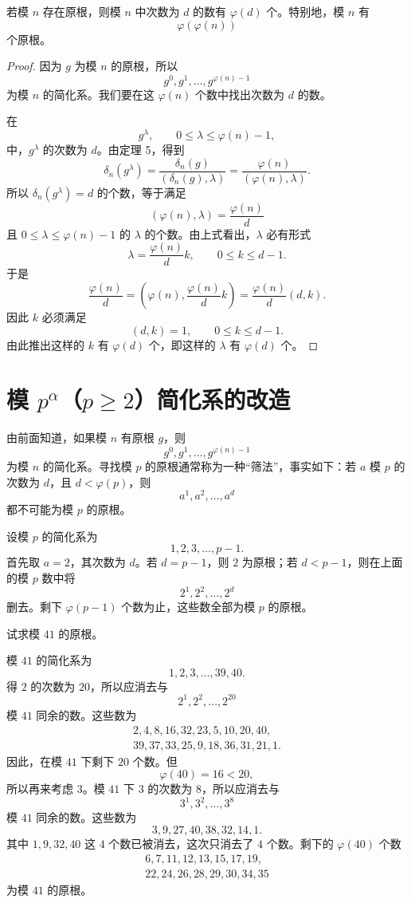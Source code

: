 \begin{theorem}[原文 定理 12]
	若模 $n$ 存在原根，则模 $n$ 中次数为 $d$ 的数有 $\varphi(d)$ 个。特别地，模 $n$ 有
	\[
		\varphi(\varphi(n))
	\]
	个原根。
\end{theorem}

\begin{proof}
	因为 $g$ 为模 $n$ 的原根，所以
	\[
		g^0,g^1,\ldots,g^{\varphi(n)-1}
	\]
	为模 $n$ 的简化系。我们要在这 $\varphi(n)$ 个数中找出次数为 $d$ 的数。

	在
	\[
		g^\lambda,\qquad 0\leq \lambda\leq \varphi(n)-1,
	\]
	中，$g^\lambda$ 的次数为 $d$。由定理 5，得到
	\[
		\delta_n(g^\lambda)
		=
		\frac{\delta_n(g)}{(\delta_n(g),\lambda)}
		=
		\frac{\varphi(n)}{(\varphi(n),\lambda)}.
	\]
	所以 $\delta_n(g^\lambda)=d$ 的个数，等于满足
	\[
		(\varphi(n),\lambda)=\frac{\varphi(n)}{d}
	\]
	且 $0\leq \lambda\leq \varphi(n)-1$ 的 $\lambda$ 的个数。由上式看出，$\lambda$ 必有形式
	\[
		\lambda=\frac{\varphi(n)}{d}k,\qquad 0\leq k\leq d-1.
	\]
	于是
	\[
		\frac{\varphi(n)}{d}
		=
		\left(\varphi(n),\frac{\varphi(n)}{d}k\right)
		=
		\frac{\varphi(n)}{d}(d,k).
	\]
	因此 $k$ 必须满足
	\[
		(d,k)=1,\qquad 0\leq k\leq d-1.
	\]
	由此推出这样的 $k$ 有 $\varphi(d)$ 个，即这样的 $\lambda$ 有 $\varphi(d)$ 个。
\end{proof}

\section{\texorpdfstring{模 \(p^\alpha\)（\(p\geq 2\)）简化系的改造}{模 p alpha 简化系的改造}}

由前面知道，如果模 $n$ 有原根 $g$，则
\[
	g^0,g^1,\ldots,g^{\varphi(n)-1}
\]
为模 $n$ 的简化系。寻找模 $p$ 的原根通常称为一种“筛法”，事实如下：若 $a$ 模 $p$ 的次数为 $d$，且 $d<\varphi(p)$，则
\[
	a^1,a^2,\ldots,a^d
\]
都不可能为模 $p$ 的原根。

设模 $p$ 的简化系为
\[
	1,2,3,\ldots,p-1.
\]
首先取 $a=2$，其次数为 $d$。若 $d=p-1$，则 $2$ 为原根；若 $d<p-1$，则在上面的模 $p$ 数中将
\[
	2^1,2^2,\ldots,2^d
\]
删去。剩下 $\varphi(p-1)$ 个数为止，这些数全部为模 $p$ 的原根。

\begin{example}[原文 例 6]
	试求模 $41$ 的原根。

	模 $41$ 的简化系为
	\[
		1,2,3,\ldots,39,40.
	\]
	得 $2$ 的次数为 $20$，所以应消去与
	\[
		2^1,2^2,\ldots,2^{20}
	\]
	模 $41$ 同余的数。这些数为
	\[
	\begin{gathered}
		2,4,8,16,32,23,5,10,20,40,\\
		39,37,33,25,9,18,36,31,21,1.
	\end{gathered}
	\]
	因此，在模 $41$ 下剩下 $20$ 个数。但
	\[
		\varphi(40)=16<20,
	\]
	所以再来考虑 $3$。模 $41$ 下 $3$ 的次数为 $8$，所以应消去与
	\[
		3^1,3^2,\ldots,3^8
	\]
	模 $41$ 同余的数。这些数为
	\[
		3,9,27,40,38,32,14,1.
	\]
	其中 $1,9,32,40$ 这 $4$ 个数已被消去，这次只消去了 $4$ 个数。剩下的 $\varphi(40)$ 个数
	\[
	\begin{gathered}
		6,7,11,12,13,15,17,19,\\
		22,24,26,28,29,30,34,35
	\end{gathered}
	\]
	为模 $41$ 的原根。
\end{example}

